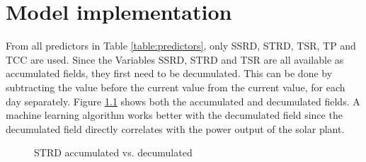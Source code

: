 \chapter{Model implementation}
\label{ch:model-implementation}

From all predictors in Table \ref{table:predictors}, only SSRD, STRD, TSR, TP and TCC are used. 
Since the Variables SSRD, STRD and TSR are all available as accumulated fields, they first need to be decumulated.
This can be done by subtracting the value before the current value from the current value, for each day separately. 
Figure \ref{fig:strd-accumulated-vs-decumulated} shows both the accumulated and decumulated fields. 
A machine learning algorithm works better with the decumulated field since the decumulated field directly correlates 
with the power output of the solar plant.

\begin{figure}[h]%
    \centering
    \qquad
    \caption{STRD accumulated vs. decumulated}%
    \label{fig:strd-accumulated-vs-decumulated}%
\end{figure}






